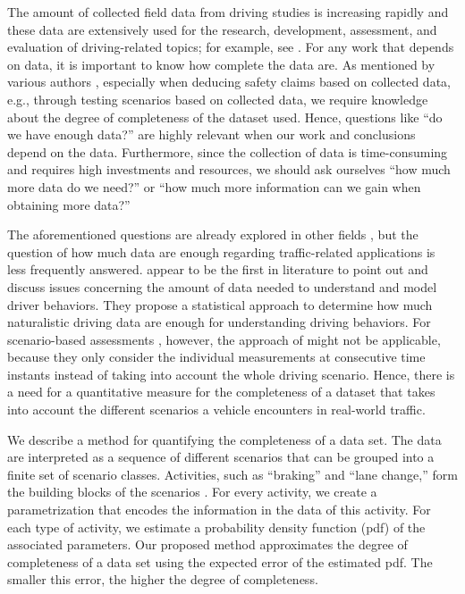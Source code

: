 The amount of collected field data from driving studies is increasing rapidly and these data are extensively used for the research, development, assessment, and evaluation of driving-related topics; for example, see \textcite{dingus2016crashrisk, klauer2006impact, williamson2011link, sadigh2014data, broggi2013extensive, zofka2015datadrivetrafficscenarios, elrofai2018scenario, deGelder2017assessment, ploeg2018cetran, putz2017pegasus, krajewski2018highD}. For any work that depends on data, it is important to know how complete the data are. As mentioned by various authors \cite{geyer2014, stellet2015taxonomy, alvarez2017prospective}, especially when deducing safety claims based on collected data, e.g., through testing scenarios based on collected data, we require knowledge about the degree of completeness of the dataset used. Hence, questions like ``do we have enough data?'' are highly relevant when our work and conclusions depend on the data. Furthermore, since the collection of data is time-consuming and requires high investments and resources, we should ask ourselves ``how much more data do we need?'' or ``how much more information can we gain when obtaining more data?''

The aforementioned questions are already explored in other fields \cite{guest2006many, blair2004evolution, marks2018howmuch, yang2012estimating, wang2017much}, but the question of how much data are enough regarding traffic-related applications is less frequently answered. \textcite{wang2017much} appear to be the first in literature to point out and discuss issues concerning the amount of data needed to understand and model driver behaviors. They propose a statistical approach to determine how much naturalistic driving data are enough for understanding driving behaviors. 
For scenario-based assessments \cite{stellet2015taxonomy, alvarez2017prospective, elrofai2018scenario, ploeg2018cetran, geyer2014}, however, the approach of \textcite{wang2017much} might not be applicable, because they only consider the individual measurements at consecutive time instants instead of taking into account the whole driving scenario. Hence, there is a need for a quantitative measure for the completeness of a dataset that takes into account the different scenarios a vehicle encounters in real-world traffic.

We describe a method for quantifying the completeness of a data set. The data are interpreted as a sequence of different scenarios that can be grouped into a finite set of scenario classes. Activities, such as ``braking'' and ``lane change,'' form the building blocks of the scenarios \cite{elrofai2018scenario}. For every activity, we create a parametrization that encodes the information in the data of this activity. For each type of activity, we estimate a probability density function (pdf) of the associated parameters. Our proposed method approximates the degree of completeness of a data set using the expected error of the estimated pdf. The smaller this error, the higher the degree of completeness.

